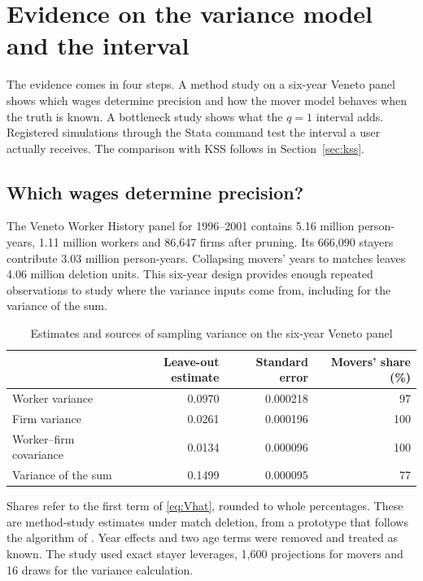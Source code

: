 \section{Evidence on the variance model and the interval}\label{sec:evidence}

The evidence comes in four steps. A method study on a six-year Veneto panel shows
which wages determine precision and how the mover model behaves when the truth is
known. A bottleneck study shows what the $q=1$ interval adds. Registered simulations
through the Stata command test the interval a user actually receives. The comparison
with KSS follows in Section~\ref{sec:kss}.

\subsection{Which wages determine precision?}
The Veneto Worker History panel for 1996--2001 contains 5.16 million
person-years, 1.11 million workers and 86,647 firms after pruning. Its
666,090 stayers contribute 3.03 million person-years. Collapsing movers'
years to matches leaves 4.06 million deletion units. This six-year design
provides enough repeated observations to study where the variance inputs
come from, including for the variance of the sum.

\begin{table}[htbp]\centering
\caption{Estimates and sources of sampling variance on the six-year Veneto panel}
\label{tab:real}
\begin{tabular}{@{}lrrr@{}}
\toprule
 & Leave-out estimate & Standard error & Movers' share (\%)\\
\midrule
Worker variance & 0.0970 & 0.000218 & 97\\
Firm variance   & 0.0261 & 0.000196 & 100\\
Worker--firm covariance & 0.0134 & 0.000096 & 100\\
Variance of the sum & 0.1499 & 0.000095 & 77\\
\bottomrule
\end{tabular}
\par\smallskip\begin{minipage}{0.92\linewidth}\footnotesize
Shares refer to the first term of \eqref{eq:Vhat}, rounded to whole
percentages. These are method-study estimates under match deletion, from a prototype
that follows the algorithm of \fevc{}. Year effects and two age terms were removed and
treated as known. The study used exact stayer leverages, 1,600 projections for movers
and 16 draws for the variance calculation.
\end{minipage}
\end{table}

